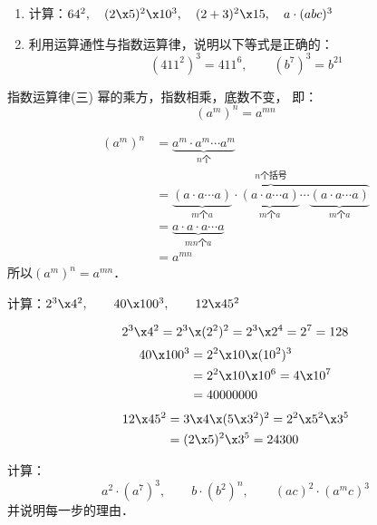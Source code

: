 \begin{ex}
	\begin{enumerate}
		\item 计算：$64^2,\quad (2\x5)^2\x10^3,\quad (2+3)^2\x15,\quad  a\cdot (abc)^3$
		\item 利用运算通性与指数运算律，说明以下等式是正确的：
		\[ (411^2)^3  = 411^6,\qquad (b^7)^3=b^{21} \]
	\end{enumerate}   
\end{ex}

\begin{blk}{指数运算律(三)}
	幂的乘方，指数相乘，底数不变，
	即：
	\[(a^m)^n=a^{mn}\]
\end{blk}

\begin{note}
	\begin{align*}
	(a^m)^n&= \underbrace{a^m\cdot a^m\cdots a^m}_{\text{$n$个}}     \tag{乘方的意义}\\  
	&=\overbrace{\underbrace{(a\cdot a\cdots a)}_{\text{$m$个$a$}}\cdot \underbrace{(a\cdot a\cdots a)}_{\text{$m$个$a$}}\cdots \underbrace{(a\cdot a\cdots a)}_{\text{$m$个$a$}}}^{\text{$n$个括号}}\\
	&=\underbrace{a\cdot a\cdot a\cdots a}_{\text{$mn$个$a$}}\tag{乘法结合律}\\
	&=a^{mn}\tag{乘方的意义}
	\end{align*}
	所以$(a^m)^n=a^{mn}$．
\end{note}

\begin{example}
	计算：$2^3\x 4^2,\qquad 40\x 100^3,\qquad 12\x 45^2$
\end{example}

\begin{solution}
	$$2^3\x 4^2=2^3\x (2^2)^2=2^3\x 2^4=2^7=128$$
	\[\begin{split}
	40\x 100^3&=2^2\x 10\x(10^2)^3\\
	&=2^2\x 10\x 10^6=4\x 10^7\\
	&=40000000
	\end{split}\]
	\[\begin{split}
	12\x 45^2&=3\x 4\x (5\x 3^2)^2=2^2\x 5^2\x 3^5\\
	&=(2\x 5)^2 \x 3^5=24300
	\end{split}\]
\end{solution}

\begin{example}
	计算：
	$$a^2\cdot (a^7)^3,\qquad b\cdot (b^2)^n,\qquad (ac)^2\cdot (a^m c)^3$$
	并说明每一步的理由．
\end{example}

